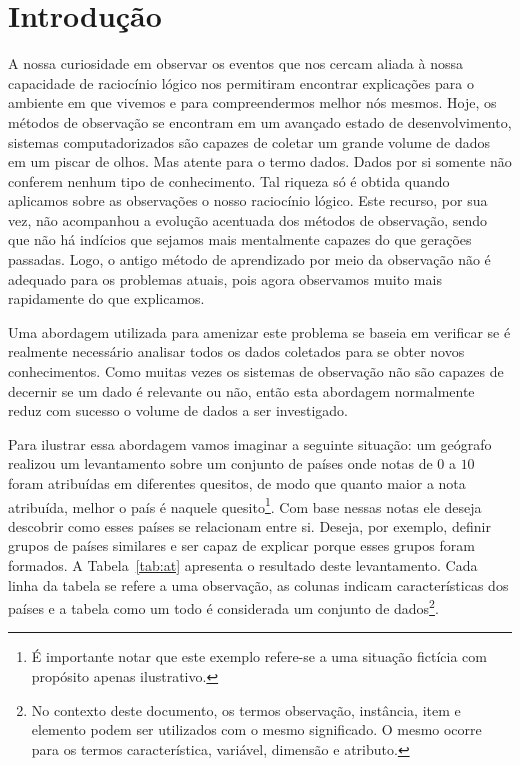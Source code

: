 \chapter{Introdução}

A nossa curiosidade em observar os eventos que nos cercam
aliada à nossa capacidade de raciocínio lógico nos
permitiram encontrar explicações para o ambiente em que
vivemos e para compreendermos melhor nós mesmos. Hoje, os
métodos de observação se encontram em um avançado estado de
desenvolvimento, sistemas computadorizados são capazes de
coletar um grande volume de dados em um piscar de
olhos. Mas atente para o termo dados. Dados por si somente
não conferem nenhum tipo de conhecimento. Tal riqueza só é
obtida quando aplicamos sobre as observações o nosso
raciocínio lógico. Este recurso, por sua vez, não
acompanhou a evolução acentuada dos métodos de
observação, sendo que não há indícios que sejamos mais
mentalmente capazes do que gerações passadas. Logo, o antigo
método de aprendizado por meio da observação não é adequado
para os problemas atuais, pois agora observamos muito mais
rapidamente do que explicamos.

Uma abordagem utilizada para amenizar este problema se
baseia em verificar se é realmente necessário analisar todos
os dados coletados para se obter novos conhecimentos. Como
muitas vezes os sistemas de observação não são capazes de
decernir se um dado é relevante ou não, então esta abordagem
normalmente reduz com sucesso o volume de dados a ser
investigado.  

Para ilustrar essa abordagem vamos imaginar a seguinte
situação: um geógrafo realizou um levantamento sobre um
conjunto de países onde notas de $0$ a $10$ foram atribuídas
em diferentes quesitos, de modo que quanto maior a nota
atribuída, melhor o país é naquele quesito\footnote{É
importante notar que este exemplo refere-se a uma
situação fictícia com propósito apenas ilustrativo.}. Com
base nessas notas ele deseja descobrir como esses países se
relacionam entre si. Deseja, por exemplo, definir grupos
de países similares e ser capaz de explicar porque esses
grupos foram formados. A Tabela~\ref{tab:at} apresenta o
resultado deste levantamento. Cada linha da tabela se
refere a uma observação, as colunas indicam características
dos países e a tabela como um todo é considerada um conjunto
de dados\footnote{No contexto deste documento, os termos
observação, instância, item e elemento podem ser
utilizados com o mesmo significado. O mesmo ocorre para
os termos característica, variável, dimensão e atributo.}.

